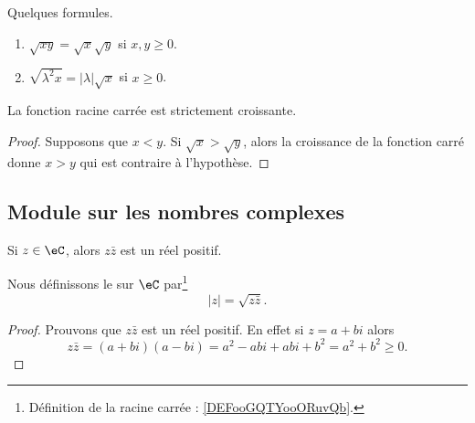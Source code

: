 \begin{lemma}       \label{LEMooWSVNooKsymDy}
	Quelques formules.
	\begin{enumerate}
		\item
		      $\sqrt{ xy }=\sqrt{ x }\sqrt{ y }$ si \( x,y\geq 0\).
		\item       \label{ITEMooEPHBooCEeJOD}
		      \( \sqrt{ \lambda^2 x }=| \lambda |\sqrt{ x }\) si \( x\geq 0\).
	\end{enumerate}
\end{lemma}

\begin{lemma}       \label{LEMooSBOAooOOIotR}
	La fonction racine carrée est strictement croissante.
\end{lemma}

\begin{proof}
	Supposons que \( x<y\). Si \( \sqrt{ x }>\sqrt{ y }\), alors la croissance de la fonction carré donne \( x>y\) qui est contraire à l'hypothèse.
\end{proof}

\subsection{Module sur les nombres complexes}

\begin{lemmaDef}        \label{LEMooVHDAooJyoakR}
	Si \( z\in \eC\), alors \( z\bar z\) est un réel positif.

	Nous définissons le  sur \( \eC\) par\footnote{Définition de la racine carrée : \ref{DEFooGQTYooORuvQb}.}
	\begin{equation}
		| z |=\sqrt{ z\bar z }.
	\end{equation}
\end{lemmaDef}

\begin{proof}
	Prouvons que \( z\bar z\) est un réel positif. En effet si \( z=a+bi\) alors
	\begin{equation}
		z\bar z=(a+bi)(a-bi)=a^2-abi+abi+b^2=a^2+b^2\geq 0.
	\end{equation}
\end{proof}


